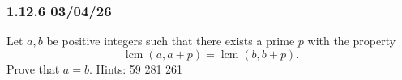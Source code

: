 \clearpage

\subsubsection{1.12.6 03/04/26}
\begin{problem}
Let $a,b$ be positive integers such that there exists a prime $p$ with the property
\[
	\operatorname{lcm}(a,a+p)=\operatorname{lcm}(b,b+p).
\]
Prove that $a=b$. Hints: 59 281 261
\end{problem}
